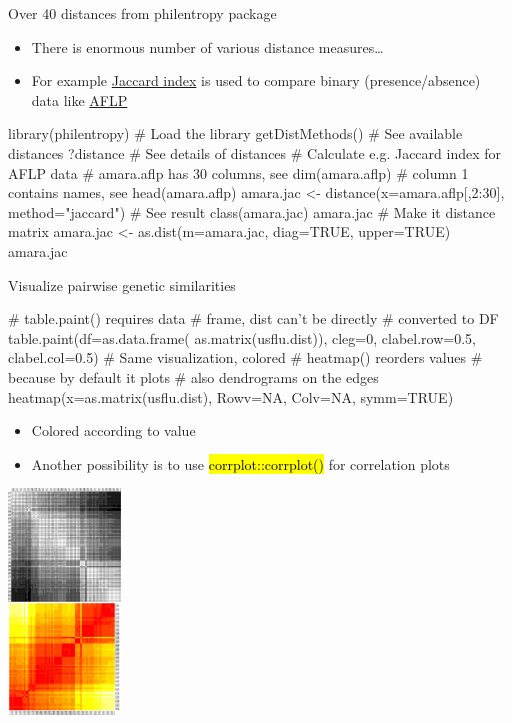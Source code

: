 \documentclass[compress, ucs, xelatex, 11pt, xcolor=svgnames,
  hyperref={
    bookmarks=true,
    unicode=true,
    colorlinks=true,
    pdftitle={Molecular data in R},
    plainpages=false,
    pdfauthor={Vojtech Zeisek},
    pdfsubject={Course about phylogeny and evolution in R},
    pdfcreator={XeLaTeX},
    pdfkeywords={R, evolution, phylogeny, molecular data},
    linkcolor=Tomato,
    anchorcolor=SaddleBrown,
    citecolor=Goldenrod,
    filecolor=DarkMagenta,
    menucolor=Sienna,
    urlcolor=DarkTurquoise,
    pdftex},
  url={hyphens, lowtilde} %
  ]{beamer}
\renewcommand{\texttt}[1]{\hl{\ttfamily #1}}
\begin{document}
\begin{frame}[fragile]{Over 40 distances from philentropy package}
  \begin{itemize}
    \item There is enormous number of various distance measures\ldots
    \item For example \href{https://en.wikipedia.org/wiki/Jaccard_index}{Jaccard index} is used to compare binary (presence/absence) data like \href{https://en.wikipedia.org/wiki/Amplified_fragment_length_polymorphism}{AFLP}
  \end{itemize}
  \begin{spluscode}
    library(philentropy) # Load the library
    getDistMethods() # See available distances
    ?distance # See details of distances
    # Calculate e.g. Jaccard index for AFLP data
    # amara.aflp has 30 columns, see dim(amara.aflp)
    # column 1 contains names, see head(amara.aflp)
    amara.jac <- distance(x=amara.aflp[,2:30], method="jaccard")
    # See result
    class(amara.jac)
    amara.jac
    # Make it distance matrix
    amara.jac <- as.dist(m=amara.jac, diag=TRUE, upper=TRUE)
    amara.jac
  \end{spluscode}
\end{frame}

\begin{frame}[fragile]{Visualize pairwise genetic similarities}
\begin{multicols}{2}
\vfil
  \begin{spluscode}
    # table.paint() requires data
    # frame, dist can't be directly
    # converted to DF
    table.paint(df=as.data.frame(
      as.matrix(usflu.dist)), cleg=0,
      clabel.row=0.5, clabel.col=0.5)
    # Same visualization, colored
    # heatmap() reorders values
    # because by default it plots
    # also dendrograms on the edges
    heatmap(x=as.matrix(usflu.dist),
      Rowv=NA, Colv=NA, symm=TRUE)
  \end{spluscode}
  \vfill
  \begin{itemize}
    \item Colored according to value
    \item Another possibility is to use \texttt{corrplot::corrplot()} for correlation plots
  \end{itemize}
  \columnbreak
  \begin{center}
    \includegraphics[height=6cm]{dna-dists.png}
  \end{center}
\end{multicols}
\end{frame}
\end{document}
